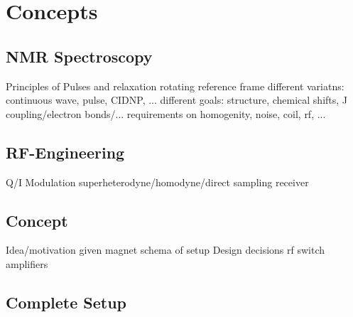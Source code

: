 \setchapterpreamble[u]{\margintoc\hfil}
\chapter{Concepts}


\section{NMR Spectroscopy}
Principles of Pulses and relaxation
rotating reference frame
different variatns: continuous wave, pulse, CIDNP, ...
different goals: structure, chemical shifts, J coupling/electron bonds/...
requirements on homogenity, noise, coil, rf, ...




\section{RF-Engineering}
Q/I Modulation
superheterodyne/homodyne/direct sampling receiver


\section{Concept}
Idea/motivation
given magnet
schema of setup
Design decisions
rf switch
amplifiers

\section{Complete Setup}


